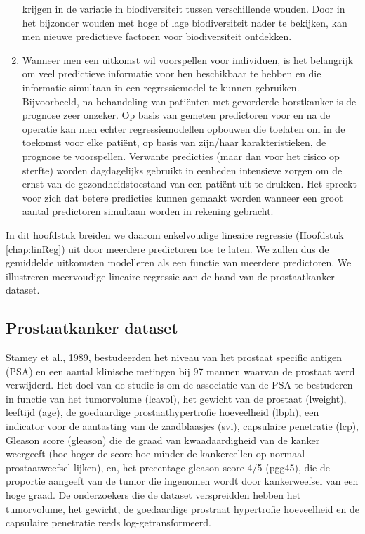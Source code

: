 \documentclass[12pt,dutch,coursenotes]{book}
\theoremstyle{definition}
\theoremstyle{definition}
\theoremstyle{definition}
\theoremstyle{remark}
\begin{document}
\begin{enumerate}
  krijgen in de variatie in biodiversiteit tussen verschillende wouden.
  Door in het bijzonder wouden met hoge of lage biodiversiteit nader te
  bekijken, kan men nieuwe predictieve factoren voor biodiversiteit
  ontdekken.
\item
  Wanneer men een uitkomst wil voorspellen voor individuen, is het
  belangrijk om veel predictieve informatie voor hen beschikbaar te
  hebben en die informatie simultaan in een regressiemodel te kunnen
  gebruiken. Bijvoorbeeld, na behandeling van patiënten met gevorderde
  borstkanker is de prognose zeer onzeker. Op basis van gemeten
  predictoren voor en na de operatie kan men echter regressiemodellen
  opbouwen die toelaten om in de toekomst voor elke patiënt, op basis
  van zijn/haar karakteristieken, de prognose te voorspellen. Verwante
  predicties (maar dan voor het risico op sterfte) worden dagdagelijks
  gebruikt in eenheden intensieve zorgen om de ernst van de
  gezondheidstoestand van een patiënt uit te drukken. Het spreekt voor
  zich dat betere predicties kunnen gemaakt worden wanneer een groot
  aantal predictoren simultaan worden in rekening gebracht.
\end{enumerate}

In dit hoofdstuk breiden we daarom enkelvoudige lineaire regressie
(Hoofdstuk \ref{chap:linReg}) uit door meerdere predictoren toe te
laten. We zullen dus de gemiddelde uitkomsten modelleren als een functie
van meerdere predictoren. We illustreren meervoudige lineaire regressie
aan de hand van de prostaatkanker dataset.

\subsection{Prostaatkanker dataset}\label{sec:prostate}

Stamey et al., 1989, bestudeerden het niveau van het prostaat specific
antigen (PSA) en een aantal klinische metingen bij 97 mannen waarvan de
prostaat werd verwijderd. Het doel van de studie is om de associatie van
de PSA te bestuderen in functie van het tumorvolume (lcavol), het
gewicht van de prostaat (lweight), leeftijd (age), de goedaardige
prostaathypertrofie hoeveelheid (lbph), een indicator voor de aantasting
van de zaadblaasjes (svi), capsulaire penetratie (lcp), Gleason score
(gleason) die de graad van kwaadaardigheid van de kanker weergeeft (hoe
hoger de score hoe minder de kankercellen op normaal prostaatweefsel
lijken), en, het precentage gleason score 4/5 (pgg45), die de proportie
aangeeft van de tumor die ingenomen wordt door kankerweefsel van een
hoge graad. De onderzoekers die de dataset verspreidden hebben het
tumorvolume, het gewicht, de goedaardige prostraat hypertrofie
hoeveelheid en de capsulaire penetratie reeds log-getransformeerd.
\end{document}
